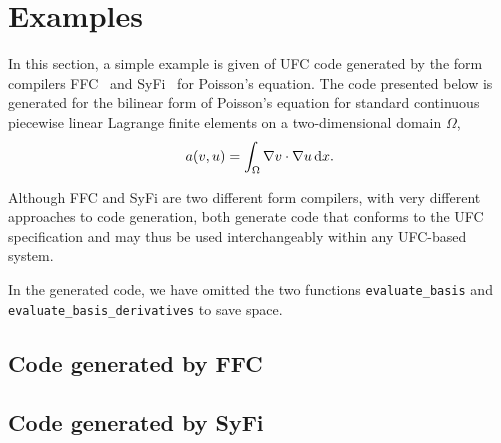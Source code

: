 \chapter{Examples}

In this section, a simple example is given of UFC code
generated by the form compilers FFC~\cite{www:ffc,other} and
SyFi~\cite{www:syfi,other} for Poisson's equation. The code presented
below is generated for the bilinear form of Poisson's equation for
standard continuous piecewise linear Lagrange finite elements
on a two-dimensional domain $\Omega$,
\begin{equation}
  a(v, u) = \int_{\Omega} \nabla v \cdot \nabla u \, \mathrm{d}x.
\end{equation}

Although FFC and SyFi are two different form compilers, with very
different approaches to code generation, both generate code that
conforms to the UFC specification and may thus be used interchangeably
within any UFC-based system.

In the generated code, we have omitted the two functions
\texttt{evaluate\_basis} and
\texttt{evaluate\_basis\_derivatives}\footnotemark{} to save space.


\section{Code generated by FFC}

\scriptsize
{}
\normalsize

\section{Code generated by SyFi}

\scriptsize
{}
\normalsize
